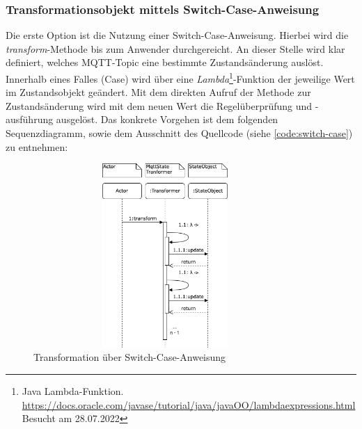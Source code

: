     \subsubsection*{Transformationsobjekt mittels Switch-Case-Anweisung}
    Die erste Option ist die Nutzung einer Switch-Case-Anweisung. Hierbei wird die \textit{transform}-Methode bis zum Anwender durchgereicht. An dieser Stelle 
    wird klar definiert, welches \acs{MQTT}-Topic eine bestimmte Zustandsänderung auslöst. Innerhalb eines Falles (Case) wird über eine 
    \textit{Lambda}\footnote{Java Lambda-Funktion. \url{https://docs.oracle.com/javase/tutorial/java/javaOO/lambdaexpressions.html} Besucht am 28.07.2022}-Funktion 
    der jeweilige Wert im Zustandsobjekt geändert. Mit dem direkten Aufruf der Methode zur Zustandsänderung wird mit dem neuen Wert die Regelüberprüfung und -ausführung 
    ausgelöst. Das konkrete Vorgehen ist dem folgenden Sequenzdiagramm, sowie dem Ausschnitt des Quellcode (siehe \ref{code:switch-case}) zu entnehmen:
    \begin{figure}[hbt!]
        \centering
        \includegraphics[width=10cm,height=7cm,keepaspectratio]{images/Transformation_old.png}
        \caption{Transformation über Switch-Case-Anweisung}
        \label{fig:sequenceTransformationOld}
    \end{figure}

